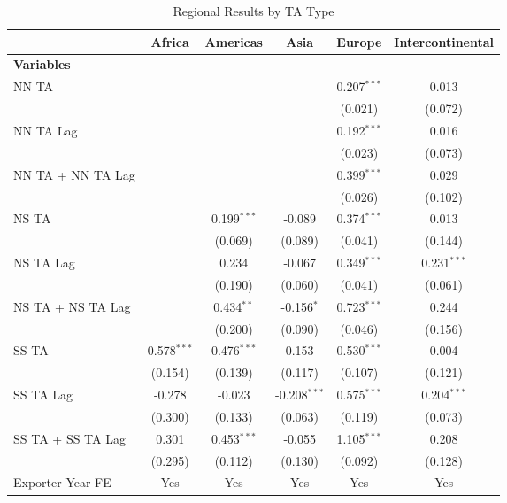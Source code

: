 \begin{table}[htbp]
    \centering
    \caption{Regional Results by TA Type}
    \label{tab:pta_types}
    \begin{adjustbox}{max width=\textwidth}
    \begin{tabular}{lccccc}
    \hline
     & \multicolumn{1}{c}{Africa} & \multicolumn{1}{c}{Americas} & \multicolumn{1}{c}{Asia} & \multicolumn{1}{c}{Europe} & \multicolumn{1}{c}{Intercontinental} \\
    \hline
    \textbf{Variables} &  &  &  &  &  \\
    \hline
    NN TA &  &  &  & 0.207$^{\ast\ast\ast}$ & 0.013 \\
     &  &  &  & (0.021) & (0.072) \\
    NN TA Lag &  &  &  & 0.192$^{\ast\ast\ast}$ & 0.016 \\
     &  &  &  & (0.023) & (0.073) \\
    NN TA + NN TA Lag &  &  &  & 0.399$^{\ast\ast\ast}$ & 0.029 \\
     &  &  &  & (0.026) & (0.102) \\
    \hline
    NS TA &  & 0.199$^{\ast\ast\ast}$ & -0.089 & 0.374$^{\ast\ast\ast}$ & 0.013 \\
     &  & (0.069) & (0.089) & (0.041) & (0.144) \\
    NS TA Lag &  & 0.234 & -0.067 & 0.349$^{\ast\ast\ast}$ & 0.231$^{\ast\ast\ast}$ \\
     &  & (0.190) & (0.060) & (0.041) & (0.061) \\
    NS TA + NS TA Lag &  & 0.434$^{\ast\ast}$ & -0.156$^{\ast}$ & 0.723$^{\ast\ast\ast}$ & 0.244 \\
     &  & (0.200) & (0.090) & (0.046) & (0.156) \\
    \hline
    SS TA & 0.578$^{\ast\ast\ast}$ & 0.476$^{\ast\ast\ast}$ & 0.153 & 0.530$^{\ast\ast\ast}$ & 0.004 \\
     & (0.154) & (0.139) & (0.117) & (0.107) & (0.121) \\
    SS TA Lag & -0.278 & -0.023 & -0.208$^{\ast\ast\ast}$ & 0.575$^{\ast\ast\ast}$ & 0.204$^{\ast\ast\ast}$ \\
     & (0.300) & (0.133) & (0.063) & (0.119) & (0.073) \\
    SS TA + SS TA Lag & 0.301 & 0.453$^{\ast\ast\ast}$ & -0.055 & 1.105$^{\ast\ast\ast}$ & 0.208 \\
     & (0.295) & (0.112) & (0.130) & (0.092) & (0.128) \\
    \hline
    Exporter-Year FE & Yes & Yes & Yes & Yes & Yes \\

\end{tabular}
\end{adjustbox}
\end{table}
